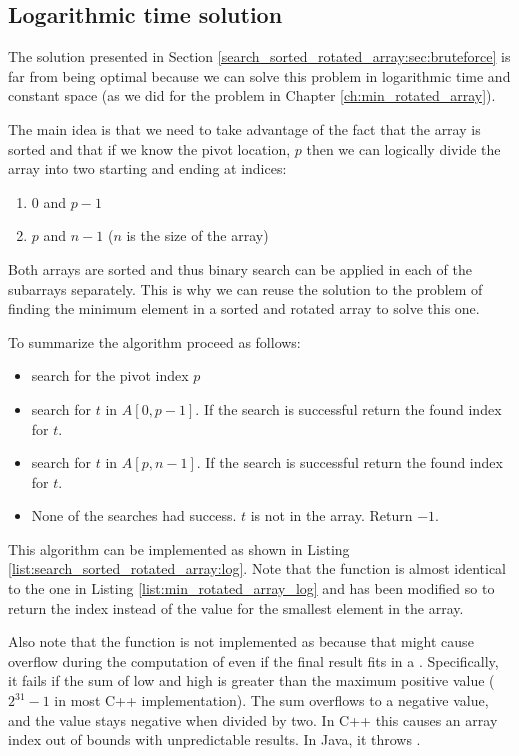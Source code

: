\subsection{Logarithmic time solution}
\label{search_sorted_rotated_array:sec:log}
The solution presented in Section \ref{search_sorted_rotated_array:sec:bruteforce} is far from being optimal because we can solve this problem in logarithmic time and constant space (as we did for the problem in Chapter \ref{ch:min_rotated_array}).

The main idea is that we need to take advantage of the fact that the array is sorted and that if we know the pivot location, $p$ then we can logically divide the array into two starting and ending at indices:
\begin{enumerate}
	\item $0$ and $p-1$
	\item $p$ and $n-1$ ($n$ is the size of the array)
\end{enumerate}
Both arrays are sorted and thus binary search can be applied in each of the subarrays separately. This is why we can reuse the solution to the problem of finding the minimum element in a sorted and rotated array to solve this one.

To summarize the algorithm proceed as follows:
\begin{itemize}
	\item search for the pivot index $p$
	\item search for $t$ in $A[0,p-1]$. If the search is successful return the found index for $t$.
	\item search for $t$ in $A[p,n-1]$.  If the search is successful return the found index for $t$.
	\item None of the searches had success. $t$ is not in the array. Return $-1$.
\end{itemize}

This algorithm can be implemented as shown in Listing \ref{list:search_sorted_rotated_array:log}. Note that the function  is almost identical to the one in Listing \ref{list:min_rotated_array_log} and has been modified so to return the index instead of the value for the smallest element in the array.

Also note that the function  is not implemented as  because that might cause overflow during the computation of  even if the final result fits in a . Specifically, it fails if the sum of low and high is greater than the maximum positive  value ($2^{31} - 1$ in most C++ implementation). The sum overflows to a negative value, and the value stays negative when divided by two. In C++ this causes an array index out of bounds with unpredictable results. In Java, it throws .

